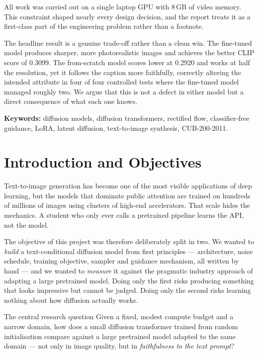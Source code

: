 \documentclass[11pt,a4paper]{article}
\begin{document}
All work was carried out on a single laptop GPU with 8\,GB of video memory. This
constraint shaped nearly every design decision, and the report treats it as a
first-class part of the engineering problem rather than a footnote.

The headline result is a genuine trade-off rather than a clean win. The
fine-tuned model produces sharper, more photorealistic images and achieves the
better CLIP score of $0.3099$. The from-scratch model scores lower at $0.2920$
and works at half the resolution, yet it follows the caption more faithfully,
correctly altering the intended attribute in four of four controlled tests where
the fine-tuned model managed roughly two. We argue that this is not a defect in
either model but a direct consequence of what each one knows.

\vspace{0.4cm}
\noindent\textbf{Keywords:} diffusion models, diffusion transformers, rectified
flow, classifier-free guidance, LoRA, latent diffusion, text-to-image synthesis,
CUB-200-2011.

\newpage
\tableofcontents
\newpage

\section{Introduction and Objectives}

Text-to-image generation has become one of the most visible applications of deep
learning, but the models that dominate public attention are trained on hundreds
of millions of images using clusters of high-end accelerators. That scale hides
the mechanics. A student who only ever calls a pretrained pipeline learns the
API, not the model.

The objective of this project was therefore deliberately split in two. We wanted
to \emph{build} a text-conditional diffusion model from first principles ---
architecture, noise schedule, training objective, sampler and guidance
mechanism, all written by hand --- and we wanted to \emph{measure} it against the
pragmatic industry approach of adapting a large pretrained model. Doing only the
first risks producing something that looks impressive but cannot be judged.
Doing only the second risks learning nothing about how diffusion actually works.

\begin{finding}{The central research question}
Given a fixed, modest compute budget and a narrow domain, how does a small
diffusion transformer trained from random initialisation compare against a large
pretrained model adapted to the same domain --- not only in image quality, but
in \emph{faithfulness to the text prompt}?
\end{finding}
\end{document}
